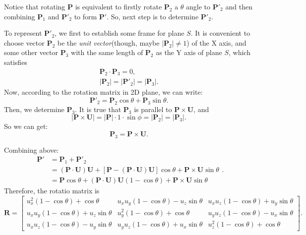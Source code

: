 \documentclass{article}
\begin{document}
Notice that rotating \textbf{P} is equivalent to firstly rotate $\mathbf{P}_2$ a $\theta$ angle to $\mathbf{P}'_2$ and then combining $\mathbf{P}_1$ and $\mathbf{P}'_2$ to form $\mathbf{P}'$. So, next step is to determine $\mathbf{P}'_2$. 

To represent $\mathbf{P}'_2$, we first to establish some frame for plane $S$. It is convenient to choose vector $\mathbf{P}_2$ be the \textit{unit vector}(though, maybe $|\mathbf{P}_2| \ne 1$) of the X axis, and some other vector $\mathbf{P}_3$ with the same length of $\mathbf{P}_2$ as the Y axis of plane $S$, which satisfies
\begin{displaymath}
\begin{split}
\mathbf{P}_2 \cdot \mathbf{P}_3 = 0, \\
|\mathbf{P}_2| = |\mathbf{P}'_2| = |\mathbf{P}_3|.
\end{split}
\end{displaymath}
Now, according to the rotation matrix in 2D plane, we can write:
\begin{displaymath}
\mathbf{P}'_2 = \mathbf{P}_2\cos{\theta} + \mathbf{P}_3\sin{\theta}.
\end{displaymath}
Then, we determine $\mathbf{P}_3$. It is true that $\mathbf{P}_3$ is parallel to $\mathbf{P}\times\mathbf{U}$, and 
\begin{displaymath}
|\mathbf{P}\times\mathbf{U}| = |\mathbf{P}| \cdot 1 \cdot \sin{\phi} = |\mathbf{P}_2| = |\mathbf{P}_3|.
\end{displaymath}
So we can get:
\begin{displaymath}
\mathbf{P}_3 = \mathbf{P}\times\mathbf{U}.
\end{displaymath}

Combining above:
\begin{displaymath}
\begin{split}
\mathbf{P}' &= \mathbf{P}_1 + \mathbf{P}'_2 \\
 &= (\mathbf{P}\cdot\mathbf{U})\mathbf{U} + [\mathbf{P}-(\mathbf{P}\cdot\mathbf{U})\mathbf{U}]\cos{\theta}+\mathbf{P}\times\mathbf{U}\sin{\theta} \\
 &= \mathbf{P}\cos{\theta} + (\mathbf{P}\cdot\mathbf{U})\mathbf{U}(1-\cos{\theta})+\mathbf{P}\times\mathbf{U}\sin{\theta}
\end{split}.
\end{displaymath}
Therefore, the rotatio matrix is
\begin{displaymath}
\mathbf{R} = \begin{bmatrix}
u_x^2(1-\cos{\theta})+\cos{\theta} & u_xu_y(1-\cos{\theta})-u_z\sin{\theta} & u_xu_z(1-\cos{\theta})+u_y\sin{\theta} \\
u_xu_y(1-\cos{\theta})+u_z\sin{\theta} & u_y^2(1-\cos{\theta})+\cos{\theta} & u_yu_z(1-\cos{\theta})-u_x\sin{\theta} \\
u_xu_z(1-\cos{\theta})-u_y\sin{\theta} &  u_yu_z(1-\cos{\theta})+u_x\sin{\theta} & u_z^2(1-\cos{\theta})+\cos{\theta}
\end{bmatrix}.
\end{displaymath}
\end{document}
